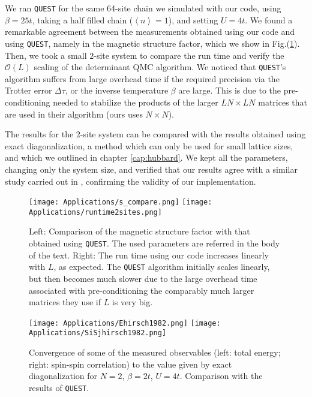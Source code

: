 We ran \texttt{QUEST} for the same 64-site chain we simulated with our code, using $\beta = 25 t$, taking a half filled chain ($\left\langle n \right\rangle = 1$), and setting $U = 4t$.
We found a remarkable agreement between the measurements obtained using our code and using \texttt{QUEST}, namely in the magnetic structure factor, which we show in Fig.(\ref{fig:quest_time}).
Then, we took a small $2$-site system to compare the run time and verify the $\mathcal{O}(L)$ scaling of the determinant \ac{QMC} algorithm.
We noticed that \texttt{QUEST}'s algorithm suffers from large overhead time if the required precision via the Trotter error $\Delta \tau$, or the inverse temperature $\beta$ are large. 
This is due to the pre-conditioning needed to stabilize the products of the larger $L N \times L N$ matrices that are used in their algorithm (ours uses $N \times N$).

The results for the $2$-site system can be compared with the results obtained using exact diagonalization, a method which can only be used for small lattice sizes, and which we outlined in chapter \ref{cap:hubbard}.
We kept all the parameters, changing only the system size, and verified that our results agree with a similar study carried out in \cite{hirsch_discrete_1983}, confirming the validity of our implementation.

\begin{figure}[H]
\hspace{0.1cm}
\texttt{[image: Applications/s\_compare.png]}
\hspace{0.5cm}
\texttt{[image: Applications/runtime2sites.png]}
\caption[Comparison of the magnetic structure factor with that obtained using \texttt{QUEST}. Run time comparison.]{Left: Comparison of the magnetic structure factor with that obtained using \texttt{QUEST}.
The used parameters are referred in the body of the text.
Right: The run time using our code increases linearly with $L$, as expected.
The \texttt{QUEST} algorithm initially scales linearly, but then becomes much slower due to the large overhead time associated with pre-conditioning the comparably much larger matrices they use if $L$ is very big.\label{fig:quest_time}}
\end{figure}
\begin{figure}[H]\label{fig:hirsch1982}
\texttt{[image: Applications/Ehirsch1982.png]}
\hspace{0.3cm}
\texttt{[image: Applications/SiSjhirsch1982.png]}
\caption[Convergence of some of the measured observables to the value given by exact diagonalization for $N=2$, $\beta = 2 t$, $U = 4 t$.
Comparison with the results of \texttt{QUEST}.]{Convergence of some of the measured observables (left: total energy; right: spin-spin correlation) to the value given by exact diagonalization for $N=2$, $\beta = 2 t$, $U = 4 t$.
Comparison with the results of \texttt{QUEST}.}
\end{figure}
